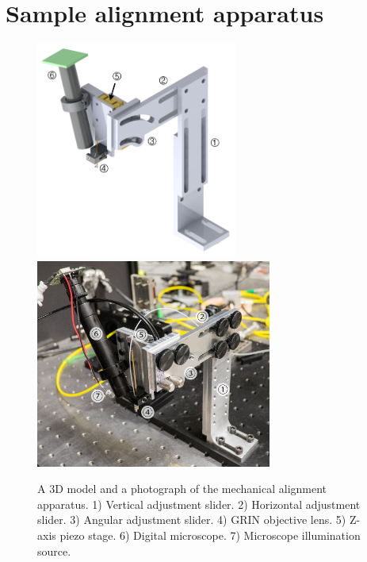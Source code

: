 
\section{Sample alignment apparatus}



\begin{figure}[h!]
\centering
\includegraphics[width=0.59\textwidth]{Images/Alignment/new_d_2_ann.png}
\\[0.8em]
\includegraphics[width=0.69\textwidth]{Images/Photographs/DSCF1696_an.jpg}
\caption[3D model and photograph of the mechanical alignment apparatus.]{A 3D model and a  photograph of the mechanical alignment apparatus. 1) Vertical adjustment slider. 2) Horizontal adjustment slider. 3) Angular adjustment slider. 4) GRIN objective lens. 5) Z-axis piezo stage. 6) Digital microscope. 7) Microscope illumination source.\label{fig:alignment_overview}}
\end{figure}


